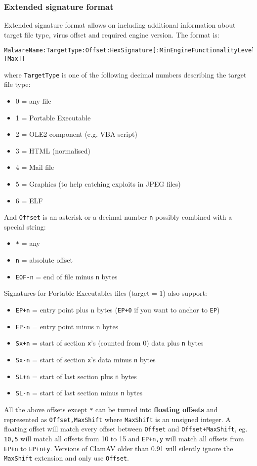 \documentclass[a4paper,titlepage,12pt]{article}
\begin{document}
    \subsubsection{Extended signature format}\label{ndb}
    Extended signature format allows on including additional information about
    target file type, virus offset and required engine version.
    The format is:
    \begin{verbatim}
MalwareName:TargetType:Offset:HexSignature[:MinEngineFunctionalityLevel:[Max]]
    \end{verbatim}
    where \verb+TargetType+ is one of the following decimal numbers describing
    the target file type:
    \begin{itemize}
	\item 0 = any file
	\item 1 = Portable Executable
	\item 2 = OLE2 component (e.g. VBA script)
	\item 3 = HTML (normalised)
	\item 4 = Mail file
	\item 5 = Graphics (to help catching exploits in JPEG files)
	\item 6 = ELF
    \end{itemize}
    And	\verb+Offset+ is an asterisk or a decimal number \verb+n+ possibly
    combined with a special string:
    \begin{itemize}
	\item \verb+*+ = any
	\item \verb+n+ = absolute offset
	\item \verb+EOF-n+ = end of file minus \verb+n+ bytes
    \end{itemize}
    Signatures for Portable Executables files (target = 1) also support:
    \begin{itemize}
	\item \verb#EP+n# = entry point plus n bytes (\verb#EP+0# if you
	want to anchor to \verb+EP+)
	\item \verb#EP-n# = entry point minus n bytes
	\item \verb#Sx+n# = start of section \verb+x+'s (counted from 0)
	data plus \verb+n+ bytes
	\item \verb#Sx-n# = start of section \verb+x+'s data minus \verb+n+ bytes
	\item \verb#SL+n# = start of last section plus \verb+n+ bytes
	\item \verb#SL-n# = start of last section minus \verb+n+ bytes
    \end{itemize}
    All the above offsets except \verb+*+ can be turned into
    \textbf{floating offsets} and represented as \verb+Offset,MaxShift+ where
    \verb+MaxShift+ is an unsigned integer. A floating offset will match every
    offset between \verb+Offset+ and \verb#Offset+MaxShift#, eg. \verb+10,5+
    will match all offsets from 10 to 15 and \verb#EP+n,y# will match all
    offsets from \verb#EP+n# to \verb#EP+n+y#. Versions of ClamAV older than
    0.91 will silently ignore the \verb+MaxShift+ extension and only use
    \verb+Offset+.\\
\end{document}
